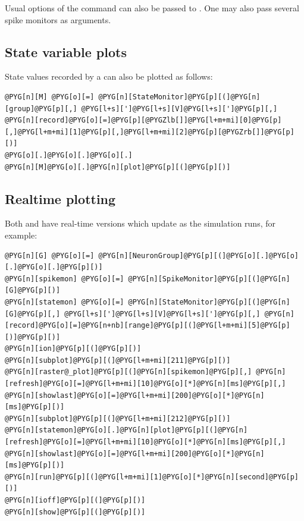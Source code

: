 \documentclass[letterpaper,10pt,english]{manual}
\begin{document}
Usual options of the  command can also be passed to \hyperlink{brian.raster_plot}{}. One may also pass
several spike monitors as arguments.


\subsection{State variable plots}

State values recorded by a \hyperlink{brian.StateMonitor}{} can also be plotted as follows:

\begin{Verbatim}[commandchars=@\[\]]
@PYG[n][M] @PYG[o][=] @PYG[n][StateMonitor]@PYG[p][(]@PYG[n][group]@PYG[p][,] @PYG[l+s][']@PYG[l+s][V]@PYG[l+s][']@PYG[p][,] @PYG[n][record]@PYG[o][=]@PYG[p][@PYGZlb[]]@PYG[l+m+mi][0]@PYG[p][,]@PYG[l+m+mi][1]@PYG[p][,]@PYG[l+m+mi][2]@PYG[p][@PYGZrb[]]@PYG[p][)]
@PYG[o][.]@PYG[o][.]@PYG[o][.]
@PYG[n][M]@PYG[o][.]@PYG[n][plot]@PYG[p][(]@PYG[p][)]
\end{Verbatim}


\subsection{Realtime plotting}

Both \hyperlink{brian.raster_plot}{} and \hyperlink{brian.StateMonitor.plot}{} have real-time versions
which update as the simulation runs, for example:

\begin{Verbatim}[commandchars=@\[\]]
@PYG[n][G] @PYG[o][=] @PYG[n][NeuronGroup]@PYG[p][(]@PYG[o][.]@PYG[o][.]@PYG[o][.]@PYG[p][)]
@PYG[n][spikemon] @PYG[o][=] @PYG[n][SpikeMonitor]@PYG[p][(]@PYG[n][G]@PYG[p][)]
@PYG[n][statemon] @PYG[o][=] @PYG[n][StateMonitor]@PYG[p][(]@PYG[n][G]@PYG[p][,] @PYG[l+s][']@PYG[l+s][V]@PYG[l+s][']@PYG[p][,] @PYG[n][record]@PYG[o][=]@PYG[n+nb][range]@PYG[p][(]@PYG[l+m+mi][5]@PYG[p][)]@PYG[p][)]
@PYG[n][ion]@PYG[p][(]@PYG[p][)]
@PYG[n][subplot]@PYG[p][(]@PYG[l+m+mi][211]@PYG[p][)]
@PYG[n][raster@_plot]@PYG[p][(]@PYG[n][spikemon]@PYG[p][,] @PYG[n][refresh]@PYG[o][=]@PYG[l+m+mi][10]@PYG[o][*]@PYG[n][ms]@PYG[p][,] @PYG[n][showlast]@PYG[o][=]@PYG[l+m+mi][200]@PYG[o][*]@PYG[n][ms]@PYG[p][)]
@PYG[n][subplot]@PYG[p][(]@PYG[l+m+mi][212]@PYG[p][)]
@PYG[n][statemon]@PYG[o][.]@PYG[n][plot]@PYG[p][(]@PYG[n][refresh]@PYG[o][=]@PYG[l+m+mi][10]@PYG[o][*]@PYG[n][ms]@PYG[p][,] @PYG[n][showlast]@PYG[o][=]@PYG[l+m+mi][200]@PYG[o][*]@PYG[n][ms]@PYG[p][)]
@PYG[n][run]@PYG[p][(]@PYG[l+m+mi][1]@PYG[o][*]@PYG[n][second]@PYG[p][)]
@PYG[n][ioff]@PYG[p][(]@PYG[p][)]
@PYG[n][show]@PYG[p][(]@PYG[p][)]
\end{Verbatim}
\end{document}
